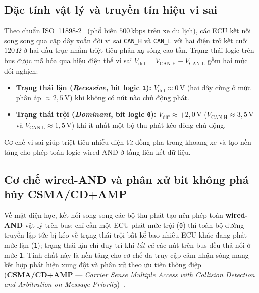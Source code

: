 \documentclass[12pt, a4paper, reqno, oneside]{book}
\DeclareRobustCommand{\code}[1]{\nolinkurl{#1}}
\begin{document}
\subsection{Đặc tính vật lý và truyền tín hiệu vi sai}
Theo chuẩn ISO~11898-2~\cite{iso11898_2_2016} (phổ biến $500\,\text{kbps}$ trên xe du lịch), các ECU kết nối song song qua cặp dây xoắn đôi vi sai \code{CAN_H} và \code{CAN_L} với hai điện trở kết cuối $120\,\Omega$ ở hai đầu trục nhằm triệt tiêu phản xạ sóng cao tần. Trạng thái logic trên bus được mã hóa qua hiệu điện thế vi sai $V_{\text{diff}} = V_{\text{CAN\_H}} - V_{\text{CAN\_L}}$ gồm hai mức đối nghịch:
\begin{itemize}
    \item \textbf{Trạng thái lặn (\textit{Recessive}, bit logic \texttt{1}):} $V_{\text{diff}} \approx 0\,\text{V}$ (hai dây cùng ở mức phân áp $\approx 2{,}5\,\text{V}$) khi không có nút nào chủ động phát.
    \item \textbf{Trạng thái trội (\textit{Dominant}, bit logic \texttt{0}):} $V_{\text{diff}} \approx +2{,}0\,\text{V}$ ($V_{\text{CAN\_H}} \approx 3{,}5\,\text{V}$ và $V_{\text{CAN\_L}} \approx 1{,}5\,\text{V}$) khi ít nhất một bộ thu phát kéo dòng chủ động.
\end{itemize}
Cơ chế vi sai giúp triệt tiêu nhiễu điện từ đồng pha trong khoang xe và tạo nền tảng cho phép toán logic wired-AND ở tầng liên kết dữ liệu.

\subsection{Cơ chế wired-AND và phân xử bit không phá hủy CSMA/CD+AMP}
Về mặt điện học, kết nối song song các bộ thu phát tạo nên phép toán \textbf{wired-AND} vật lý trên bus: chỉ cần một ECU phát mức trội (\texttt{0}) thì toàn bộ đường truyền lập tức bị kéo về trạng thái trội bất kể bao nhiêu ECU khác đang phát mức lặn (\texttt{1}); trạng thái lặn chỉ duy trì khi \emph{tất cả} các nút trên bus đều thả nổi ở mức \texttt{1}. Tính chất này là nền tảng cho cơ chế đa truy cập cảm nhận sóng mang kết hợp phát hiện xung đột và phân xử theo ưu tiên thông điệp (\textbf{CSMA/CD+AMP} --- \textit{Carrier Sense Multiple Access with Collision Detection and Arbitration on Message Priority})~\cite{bosch1991can,iso11898_1_2015}.
\end{document}
